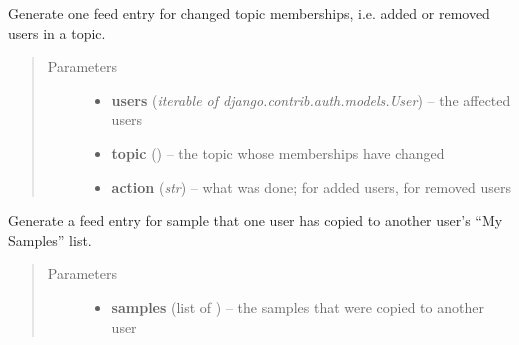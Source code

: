 \documentclass[a4paper,11pt,english]{sphinxmanual}
\begin{document}
\begin{fulllineitems}
\begin{fulllineitems}
\begin{quote}
\begin{description}
\end{description}\end{quote}

\end{fulllineitems}


\begin{fulllineitems}
\label{programming/utilities:samples.utils.views.Reporter.report_changed_topic_membership}
Generate one feed entry for changed topic memberships, i.e. added
or removed users in a topic.
\begin{quote}\begin{description}
\item[{Parameters}] \leavevmode\begin{itemize}
\item {} 
\textbf{users} (\emph{iterable of django.contrib.auth.models.User}) -- the affected users

\item {} 
\textbf{topic} () -- the topic whose memberships have changed

\item {} 
\textbf{action} (\emph{str}) -- what was done;  for added users, 
for removed users

\end{itemize}

\end{description}\end{quote}

\end{fulllineitems}


\begin{fulllineitems}
\label{programming/utilities:samples.utils.views.Reporter.report_copied_my_samples}
Generate a feed entry for sample that one user has copied to
another user's “My Samples” list.
\begin{quote}\begin{description}
\item[{Parameters}] \leavevmode\begin{itemize}
\item {} 
\textbf{samples} (list of ) -- the samples that were copied to another user


\end{itemize}
\end{description}
\end{quote}
\end{fulllineitems}
\end{fulllineitems}
\end{document}
